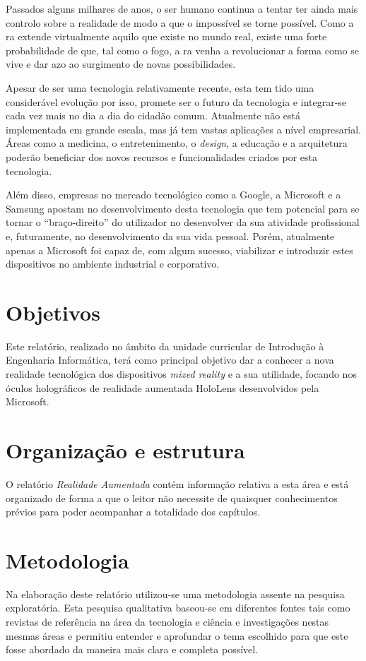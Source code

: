 \documentclass{report}
\begin{document}
Passados alguns milhares de anos, o ser humano continua a tentar ter ainda mais controlo sobre a realidade de modo a que o impossível se torne possível. Como a \ac{ra} extende virtualmente aquilo que existe no mundo real, existe uma forte probabilidade de que, tal como o fogo, a \ac{ra} venha a revolucionar a forma como se vive e dar azo ao surgimento de novas possibilidades.

Apesar de ser uma tecnologia relativamente recente, esta tem tido uma considerável evolução por isso, promete ser o futuro da tecnologia e integrar-se cada vez mais no dia a dia do cidadão comum. Atualmente não está implementada em grande escala, mas já tem vastas aplicações a nível empresarial. Áreas como a medicina, o entretenimento, o \textit{design}, a educação e a arquitetura poderão beneficiar dos novos recursos e funcionalidades criados por esta tecnologia.

Além disso, empresas no mercado tecnológico como a Google, a Microsoft e a Samsung apostam no desenvolvimento desta tecnologia que tem potencial para se tornar o “braço-direito” do utilizador no desenvolver da sua atividade profissional e, futuramente, no desenvolvimento da sua vida pessoal. Porém, atualmente apenas a Microsoft foi capaz de, com algum sucesso, viabilizar e introduzir estes dispositivos no ambiente industrial e corporativo.

\section{Objetivos}
Este relatório, realizado no âmbito da unidade curricular de Introdução à Engenharia Informática, terá como principal objetivo dar a conhecer a nova realidade tecnológica dos dispositivos \textit{mixed reality} e a sua utilidade, focando nos óculos holográficos de realidade aumentada HoloLens desenvolvidos pela Microsoft. 

\section{Organização e estrutura}
O relatório \textit{Realidade Aumentada} contém informação relativa a esta área e está organizado de forma a que o leitor não necessite de quaisquer conhecimentos prévios para poder acompanhar a totalidade dos capítulos.

\section{Metodologia}
Na elaboração deste relatório utilizou-se uma metodologia assente na pesquisa exploratória. Esta pesquisa qualitativa baseou-se em diferentes fontes tais como revistas de referência na área da tecnologia e ciência e investigações nestas mesmas áreas e permitiu entender e aprofundar o tema escolhido para que este fosse abordado da maneira mais clara e completa possível.
\end{document}
